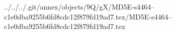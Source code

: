 ../../../.git/annex/objects/9Q/gX/MD5E-s4464--c1e0dba9255b6fd8cdc12f879fd19ad7.tex/MD5E-s4464--c1e0dba9255b6fd8cdc12f879fd19ad7.tex